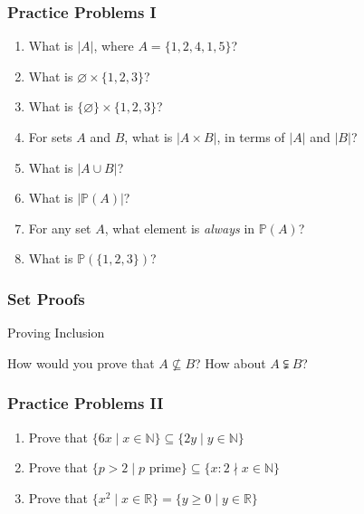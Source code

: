 \documentclass{beamer}
\let\emptyset\varnothing
\begin{document}
\begin{frame}[t]
  \frametitle{Practice Problems I}

  \begin{enumerate}[<+->]
    \item What is $|A|$, where $A = \{1, 2, 4, 1, 5\}$?
    \item What is $\emptyset \times \{1, 2, 3\}$?
    \item What is $\{\emptyset\} \times \{1, 2, 3\}$?
    \item For sets $A$ and $B$, what is $|A \times B|$, in terms of $|A|$ and $|B|$?
    \item What is $|A \cup B|$?
    \item What is $|\mathbb{P}(A)|$?
    \item For any set $A$, what element is \textit{always} in $\mathbb{P}(A)$?
    \item What is $\mathbb{P}(\{1, 2, 3\})$?
  \end{enumerate}
  
\end{frame}

\begin{frame}
  \frametitle{Set Proofs}
    \begin{block}{Proving Inclusion}
        
    \end{block}
    \vspace{2cm}
    \pause
    How would you prove that $A \not \subseteq B$? How about $A \subsetneqq B$?
\end{frame}

\begin{frame}[t]
  \frametitle{Practice Problems II}
  \begin{enumerate}[<+->]
    \item Prove that $\{6x \mid x \in \mathbb{N}\} \subseteq \{2y \mid y \in \mathbb{N}\}$
    \item Prove that $\{p > 2 \mid p \text{ prime}\} \subseteq \{x : 2 \nmid x \in \mathbb{N}\}$
    \item Prove that $\{x^2 \mid x \in \mathbb{R}\} = \{y \geq 0 \mid y \in \mathbb{R}\}$
  \end{enumerate}
\end{frame}
\end{document}
